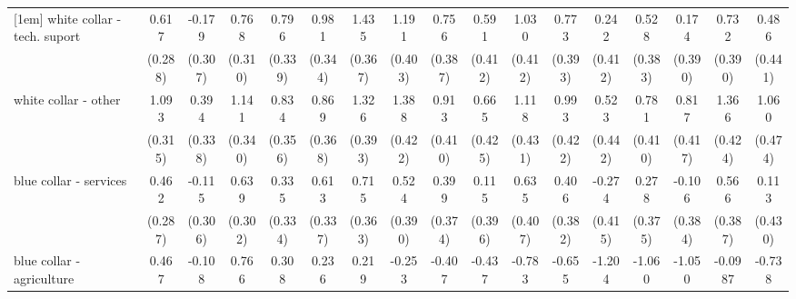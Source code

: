 {\begin{tabular}{l*{16}{c}}
[1em]
white collar - tech. suport&       0.617\sym{*}  &      -0.179         &       0.768\sym{*}  &       0.796\sym{*}  &       0.981\sym{**} &       1.435\sym{***}&       1.191\sym{**} &       0.756         &       0.591         &       1.030\sym{*}  &       0.773\sym{*}  &       0.242         &       0.528         &       0.174         &       0.732         &       0.486         \\
                    &     (0.288)         &     (0.307)         &     (0.310)         &     (0.339)         &     (0.344)         &     (0.367)         &     (0.403)         &     (0.387)         &     (0.412)         &     (0.412)         &     (0.393)         &     (0.412)         &     (0.383)         &     (0.390)         &     (0.390)         &     (0.441)         \\
[1em]
white collar - other&       1.093\sym{***}&       0.394         &       1.141\sym{***}&       0.834\sym{*}  &       0.869\sym{*}  &       1.326\sym{***}&       1.388\sym{***}&       0.913\sym{*}  &       0.665         &       1.118\sym{**} &       0.993\sym{*}  &       0.523         &       0.781         &       0.817\sym{*}  &       1.366\sym{**} &       1.060\sym{*}  \\
                    &     (0.315)         &     (0.338)         &     (0.340)         &     (0.356)         &     (0.368)         &     (0.393)         &     (0.422)         &     (0.410)         &     (0.425)         &     (0.431)         &     (0.422)         &     (0.442)         &     (0.410)         &     (0.417)         &     (0.424)         &     (0.474)         \\
[1em]
blue collar - services&       0.462         &      -0.115         &       0.639\sym{*}  &       0.335         &       0.613         &       0.715\sym{*}  &       0.524         &       0.399         &       0.115         &       0.635         &       0.406         &      -0.274         &       0.278         &      -0.106         &       0.566         &       0.113         \\
                    &     (0.287)         &     (0.306)         &     (0.302)         &     (0.334)         &     (0.337)         &     (0.363)         &     (0.390)         &     (0.374)         &     (0.396)         &     (0.407)         &     (0.382)         &     (0.415)         &     (0.375)         &     (0.384)         &     (0.387)         &     (0.430)         \\
[1em]
blue collar - agriculture&       0.467         &      -0.108         &       0.766         &       0.308         &       0.236         &       0.219         &      -0.253         &      -0.407         &      -0.437         &      -0.783         &      -0.655         &      -1.204\sym{*}  &      -1.060\sym{*}  &      -1.050\sym{*}  &     -0.0987         &      -0.738         \\

\end{tabular}}
